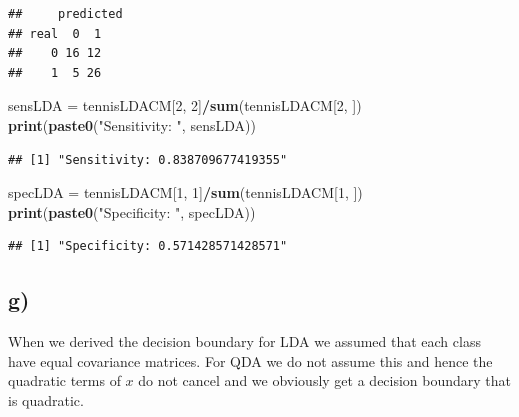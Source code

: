 \documentclass[
]{article}
\newenvironment{Shaded}{\begin{snugshade}}{\end{snugshade}}
\newcommand{\DataTypeTok}[1]{\textcolor[rgb]{0.13,0.29,0.53}{#1}}
\newcommand{\DecValTok}[1]{\textcolor[rgb]{0.00,0.00,0.81}{#1}}
\newcommand{\KeywordTok}[1]{\textcolor[rgb]{0.13,0.29,0.53}{\textbf{#1}}}
\newcommand{\NormalTok}[1]{#1}
\newcommand{\OperatorTok}[1]{\textcolor[rgb]{0.81,0.36,0.00}{\textbf{#1}}}
\newcommand{\StringTok}[1]{\textcolor[rgb]{0.31,0.60,0.02}{#1}}
\begin{document}
\begin{verbatim}
##     predicted
## real  0  1
##    0 16 12
##    1  5 26
\end{verbatim}

\begin{Shaded}
\begin{Highlighting}[]
\NormalTok{sensLDA =}\StringTok{ }\NormalTok{tennisLDACM[}\DecValTok{2}\NormalTok{, }\DecValTok{2}\NormalTok{]}\OperatorTok{/}\KeywordTok{sum}\NormalTok{(tennisLDACM[}\DecValTok{2}\NormalTok{, ])}
\KeywordTok{print}\NormalTok{(}\KeywordTok{paste0}\NormalTok{(}\StringTok{"Sensitivity: "}\NormalTok{, sensLDA))}
\end{Highlighting}
\end{Shaded}

\begin{verbatim}
## [1] "Sensitivity: 0.838709677419355"
\end{verbatim}

\begin{Shaded}
\begin{Highlighting}[]
\NormalTok{specLDA =}\StringTok{ }\NormalTok{tennisLDACM[}\DecValTok{1}\NormalTok{, }\DecValTok{1}\NormalTok{]}\OperatorTok{/}\KeywordTok{sum}\NormalTok{(tennisLDACM[}\DecValTok{1}\NormalTok{, ])}
\KeywordTok{print}\NormalTok{(}\KeywordTok{paste0}\NormalTok{(}\StringTok{"Specificity: "}\NormalTok{, specLDA))}
\end{Highlighting}
\end{Shaded}

\begin{verbatim}
## [1] "Specificity: 0.571428571428571"
\end{verbatim}

\hypertarget{g-2}{%
\subsection{g)}\label{g-2}}

When we derived the decision boundary for LDA we assumed that each class
have equal covariance matrices. For QDA we do not assume this and hence
the quadratic terms of \(x\) do not cancel and we obviously get a
decision boundary that is quadratic.

\begin{Shaded}
\end{Shaded}
\end{document}
